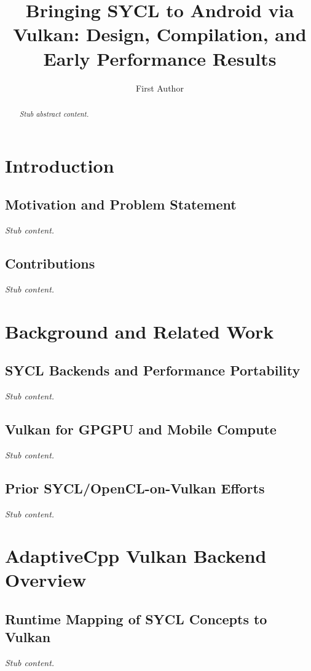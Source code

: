 \documentclass[sigconf]{acmart}
\title{Bringing SYCL to Android via Vulkan: Design, Compilation, and Early Performance Results}
\author{First Author}
\affiliation{%
  \institution{Institution}
  \city{City}
  \country{Country}
}
\begin{document}
\begin{abstract}
\textit{Stub abstract content.}
\end{abstract}


\maketitle

\section{Introduction}
\subsection{Motivation and Problem Statement}
\textit{Stub content.}

\subsection{Contributions}
\textit{Stub content.}

\section{Background and Related Work}
\subsection{SYCL Backends and Performance Portability}
\textit{Stub content.}

\subsection{Vulkan for GPGPU and Mobile Compute}
\textit{Stub content.}

\subsection{Prior SYCL/OpenCL-on-Vulkan Efforts}
\textit{Stub content.}

\section{AdaptiveCpp Vulkan Backend Overview}
\subsection{Runtime Mapping of SYCL Concepts to Vulkan}
\textit{Stub content.}
\end{document}
